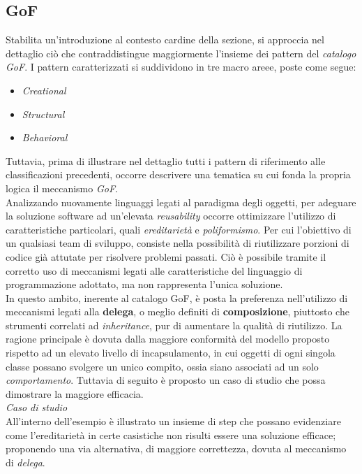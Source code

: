 \documentclass{article}
\begin{document}
\subsection*{GoF}
\large
Stabilita un'introduzione al contesto cardine della sezione, si approccia nel dettaglio ciò che contraddistingue maggiormente l'insieme dei pattern del \textit{catalogo GoF}. I pattern caratterizzati si suddividono in tre macro areee, poste come segue:
\begin{itemize}[label={-}]
    \itemsep0em
    \item \textit{Creational}
    \item \textit{Structural} 
    \item \textit{Behavioral} 
\end{itemize} 
Tuttavia, prima di illustrare nel dettaglio tutti i pattern di riferimento alle classificazioni precedenti, occorre descrivere una tematica su cui fonda la propria logica il meccanismo \textit{GoF}.\vspace*{14pt}\\
Analizzando nuovamente linguaggi legati al paradigma degli oggetti, per adeguare la soluzione software ad un'elevata \textit{reusability} occorre ottimizzare l'utilizzo di caratteristiche particolari, quali \textit{ereditarietà} e \textit{poliformismo}. Per cui l'obiettivo di un qualsiasi team di sviluppo, consiste nella possibilità di riutilizzare porzioni di codice già attutate per risolvere problemi passati. Ciò è possibile tramite il corretto uso di meccanismi legati alle caratteristiche del linguaggio di programmazione adottato, ma non rappresenta l'unica soluzione.\vspace*{14pt}\\
In questo ambito, inerente al catalogo GoF, è posta la preferenza nell'utilizzo di meccanismi legati alla \textbf{delega}, o meglio definiti di \textbf{composizione}, piuttosto che strumenti correlati ad \textit{inheritance}, pur di aumentare la qualità di riutilizzo. La ragione principale è dovuta dalla maggiore conformità del modello proposto rispetto ad un elevato livello di incapsulamento, in cui oggetti di ogni singola classe possano svolgere un unico compito, ossia siano associati ad un solo \textit{comportamento}. Tuttavia di seguito è proposto un caso di studio che possa dimostrare la maggiore efficacia.\vspace*{14pt}\\
\textit{Caso di studio}\\
All'interno dell'esempio è illustrato un insieme di step che possano evidenziare come l'ereditarietà in certe casistiche non risulti essere una soluzione efficace; proponendo una via alternativa, di maggiore correttezza, dovuta al meccanismo di \textit{delega}.
\end{document}
